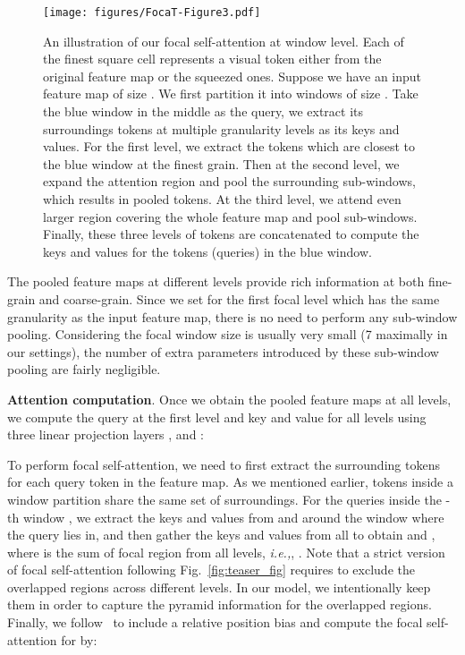 \documentclass{article}
\begin{document}
\begin{figure}[t]
\centering
    \texttt{[image: figures/FocaT-Figure3.pdf]}
  \caption{An illustration of our focal self-attention at window level. Each of the finest square cell represents a visual token either from the original feature map or the squeezed ones. Suppose we have an input feature map of size . We first partition it into  windows of size . Take the  blue window in the middle as the query, we extract its surroundings tokens at multiple granularity levels as its keys and values. For the first level, we extract the  tokens which are closest to the blue window at the finest grain. Then at the second level, we expand the attention region and pool the surrounding  sub-windows, which results in  pooled tokens. At the third level, we attend even larger region covering the whole feature map and pool  sub-windows. Finally, these three levels of tokens are concatenated to compute the keys and values for the  tokens (queries) in the blue window.}
  \label{fig:window_focal_attention}
\end{figure}

The pooled feature maps  at different levels  provide rich information at both fine-grain and coarse-grain. Since we set  for the first focal level which has the same granularity as the input feature map, there is no need to perform any sub-window pooling. Considering the focal window size is usually very small (7 maximally in our settings), the number of extra parameters introduced by these sub-window pooling are fairly negligible.

\textbf{Attention computation}. Once we obtain the pooled feature maps  at all  levels, we compute the query at the first level and key and value for all levels using three linear projection layers ,  and :


To perform focal self-attention, we need to first extract the surrounding tokens for each query token in the feature map. As we mentioned earlier, tokens inside a window partition  share the same set of surroundings. For the queries inside the -th window , we extract the  keys and values from  and  around the window where the query lies in, and then gather the keys and values from all  to obtain  and , where  is the sum of focal region from all levels, \textit{i.e.,}, . Note that a strict version of focal self-attention following Fig.~\ref{fig:teaser_fig} requires to exclude the overlapped regions across different levels. In our model, we intentionally keep them in order to capture the pyramid information for the overlapped regions. Finally, we follow~\cite{liu2021swin} to include a relative position bias and compute the focal self-attention for  by:
\end{document}
